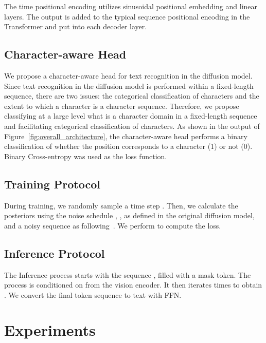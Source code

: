 \documentclass{article}
\begin{document}
The time positional encoding utilizes sinusoidal positional embedding and linear layers. The output is added to the typical sequence positional encoding in the Transformer and put into each decoder layer.


\subsection{Character-aware Head}
We propose a character-aware head for text recognition in the diffusion model.
Since text recognition in the diffusion model is performed within a fixed-length sequence, there are two issues: the categorical classification of characters and the extent to which a character is a character sequence.
Therefore, we propose classifying at a large level what is a character domain in a fixed-length sequence and facilitating categorical classification of characters.
As shown in the output of Figure~\ref{fig:overall_architecture}, the character-aware head performs a binary classification of whether the position corresponds to a character (1) or not (0).
Binary Cross-entropy was used as the loss function.

\subsection{Training Protocol}
During training, we randomly sample a time step .
Then, we calculate the posteriors using the noise schedule , , as defined in the original diffusion model, and a noisy sequence  as following~\cite{Hoogeboom2021argmax}.
We perform  to compute the loss.


\subsection{Inference Protocol}
The Inference process starts with the sequence , filled with a mask token.
The process is conditioned on  from the vision encoder.
It then iterates  times to obtain .
We convert the final token sequence to text with FFN. 
\section{Experiments} \label{sec:experiments}
\end{document}
